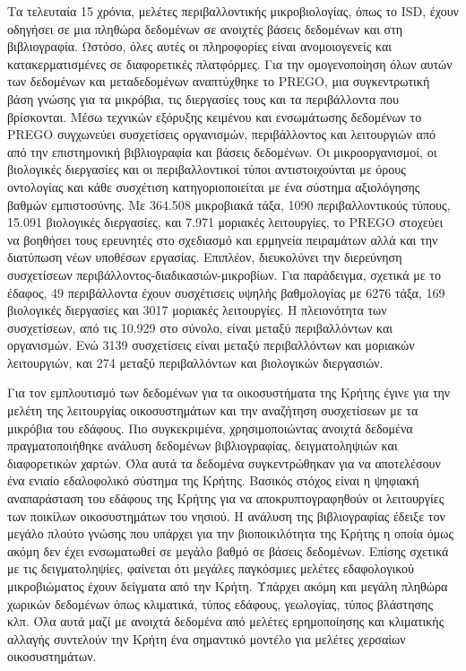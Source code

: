 \documentclass[11pt]{article}
\begin{document}
Τα τελευταία 15 χρόνια, μελέτες περιβαλλοντικής μικροβιολογίας, όπως το \textlatin{ISD}, 
έχουν οδηγήσει σε μια πληθώρα δεδομένων σε ανοιχτές βάσεις δεδομένων και στη
βιβλιογραφία.
Ωστόσο, όλες αυτές οι πληροφορίες είναι ανομοιογενείς και κατακερματισμένες σε διαφορετικές πλατφόρμες.
Για την ομογενοποίηση όλων αυτών των δεδομένων και μεταδεδομένων 
αναπτύχθηκε το \textlatin{PREGO}, μια συγκεντρωτική βάση γνώσης για τα μικρόβια, τις διεργασίες τους και
τα περιβάλλοντα που βρίσκονται.
Μέσω τεχνικών εξόρυξης κειμένου και ενσωμάτωσης δεδομένων το \textlatin{PREGO} συγχωνεύει 
συσχετίσεις οργανισμών, περιβάλλοντος και λειτουργιών από
από την επιστημονική βιβλιογραφία και βάσεις δεδομένων. 
Οι μικροοργανισμοί, οι βιολογικές διεργασίες και οι περιβαλλοντικοί τύποι αντιστοιχούνται
με όρους οντολογίας και κάθε συσχέτιση κατηγοριοποιείται με ένα σύστημα αξιολόγησης 
βαθμών εμπιστοσύνης.
Με 364.508 μικροβιακά τάξα, 1090 περιβαλλοντικούς τύπους, 15.091 βιολογικές διεργασίες,
και 7.971 μοριακές λειτουργίες, το \textlatin{PREGO} στοχεύει να βοηθήσει τους ερευνητές στο 
σχεδιασμό και ερμηνεία πειραμάτων αλλά και την διατύπωση νέων υποθέσων εργασίας.
Επιπλέον, διευκολύνει την διερεύνηση συσχετίσεων περιβάλλοντος-διαδικασιών-μικροβίων.
Για παράδειγμα, σχετικά με το έδαφος, 49 περιβάλλοντα έχουν συσχέτισεις υψηλής βαθμολογίας με 
6276 τάξα, 169 βιολογικές διεργασίες και 3017 μοριακές λειτουργίες.
Η πλειονότητα των συσχετίσεων, από τις 10.929 στο σύνολο, είναι μεταξύ περιβαλλόντων 
και οργανισμών. Ενώ 3139 συσχετίσεις είναι μεταξύ περιβαλλόντων και μοριακών λειτουργιών, 
και 274 μεταξύ περιβαλλόντων και βιολογικών διεργασιών.

Για τον εμπλουτισμό των δεδομένων για τα οικοσυστήματα της Κρήτης έγινε για την μελέτη
της λειτουργίας οικοσυστημάτων και την αναζήτηση συσχετίσεων με τα 
μικρόβια του εδάφους.
Πιο συγκεκριμένα, χρησιμοποιώντας ανοιχτά δεδομένα πραγματοποιήθηκε ανάλυση 
δεδομένων βιβλιογραφίας, δειγματοληψιών και διαφορετικών χαρτών. Όλα αυτά τα δεδομένα
συγκεντρώθηκαν για να αποτελέσουν ένα ενιαίο εδαλοφολικό σύστημα της Κρήτης. 
Βασικός στόχος είναι η ψηφιακή αναπαράσταση του εδάφους της Κρήτης για να αποκρυπτογραφηθούν
οι λειτουργίες των ποικίλων οικοσυστημάτων του νησιού.
Η ανάλυση της βιβλιογραφίας έδειξε τον μεγάλο πλούτο γνώσης που υπάρχει για την 
βιοποικιλότητα της Κρήτης η οποία όμως ακόμη δεν έχει ενσωματωθεί σε μεγάλο βαθμό σε βάσεις 
δεδομένων. 
Επίσης σχετικά με τις δειγματοληψίες, φαίνεται ότι μεγάλες παγκόσμιες 
μελέτες εδαφολογικού μικροβιώματος έχουν δείγματα από την Κρήτη. 
Υπάρχει ακόμη και μεγάλη πληθώρα χωρικών δεδομένων όπως κλιματικά, 
τύπος εδάφους, γεωλογίας, τύπος βλάστησης κλπ.
Όλα αυτά μαζί με ανοιχτά δεδομένα από μελέτες ερημοποίησης και κλιματικής αλλαγής
συντελούν την Κρήτη ένα σημαντικό μοντέλο για μελέτες χερσαίων οικοσυστημάτων.
\end{document}
